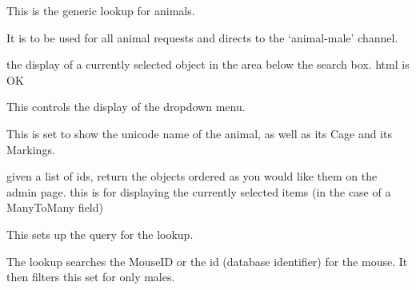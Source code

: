 \documentclass[letterpaper,10pt,english]{sphinxmanual}
\begin{document}

\begin{fulllineitems}
\label{animals:mousedb.animal.lookups.AnimalLookupMale}
This is the generic lookup for animals.

It is to be used for all animal requests and directs to the `animal-male' channel.

\begin{fulllineitems}
\label{animals:mousedb.animal.lookups.AnimalLookupMale.format_item}
the display of a currently selected object in the area below the search box. html is OK

\end{fulllineitems}


\begin{fulllineitems}
\label{animals:mousedb.animal.lookups.AnimalLookupMale.format_result}
This controls the display of the dropdown menu.

This is set to show the unicode name of the animal, as well as its Cage and its Markings.

\end{fulllineitems}


\begin{fulllineitems}
\label{animals:mousedb.animal.lookups.AnimalLookupMale.get_objects}
given a list of ids, return the objects ordered as you would like them on the admin page.
this is for displaying the currently selected items (in the case of a ManyToMany field)

\end{fulllineitems}


\begin{fulllineitems}
\label{animals:mousedb.animal.lookups.AnimalLookupMale.get_query}
This sets up the query for the lookup.

The lookup searches the MouseID or the id (database identifier) for the mouse.  It then filters this set for only males.

\end{fulllineitems}


\end{fulllineitems}
\end{document}
